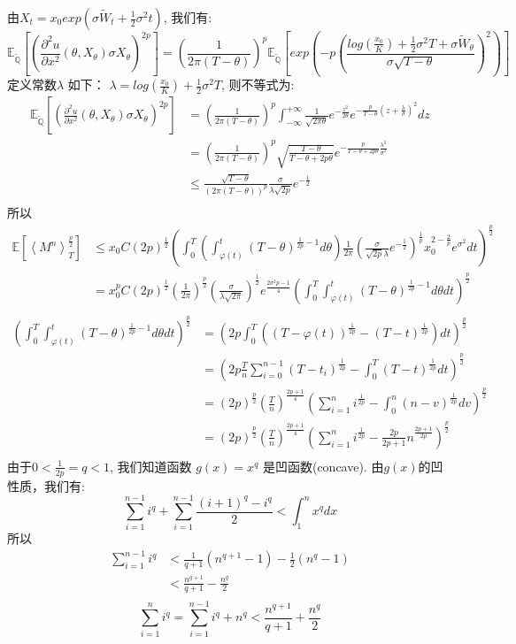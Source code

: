 由$X_t=x_0exp(\sigma \widetilde{W}_t+\frac{1}{2}\sigma^2t)$, 我们有:
\[
\mathbb{E}_{\widetilde{\mathbb{Q}}}[ (\frac{\partial^2 u}{\partial x^2}(\theta, X_\theta)\sigma X_\theta)^{2p}]
=(\frac{1}{2\pi(T-\theta)})^p\mathbb{E}_{\widetilde{\mathbb{Q}}}[exp(-p(\frac{log(\frac{x_0}{K})+\frac{1}{2}\sigma^2T+\sigma\widetilde{W}_{\theta}}{\sigma\sqrt{T-\theta}})^2)]
\]
定义常数$\lambda$ 如下： $\lambda=log(\frac{x_0}{K})+\frac{1}{2}\sigma^2T$, 则不等式为:
\[
\begin{split}
\mathbb{E}_{\widetilde{\mathbb{Q}}}[ (\frac{\partial^2 u}{\partial x^2}(\theta, X_\theta)\sigma X_\theta)^{2p}]
&=(\frac{1}{2\pi(T-\theta)})^p\int^{+\infty}_{-\infty}\frac{1}{\sqrt{2\pi\theta}}e^{-\frac{z^2}{2\theta}}e^{-\frac{p}{T-\theta}(z+\frac{\lambda}{\sigma})^2}dz\\
&=(\frac{1}{2\pi(T-\theta)})^p\sqrt{\frac{T-\theta}{T-\theta+2p\theta}}e^{-\frac{p}{T-\theta+2p\theta}\frac{\lambda^2}{\sigma^2}}\\
&\leq \frac{\sqrt{T-\theta}}{(2\pi(T-\theta))^p}\frac{\sigma}{\lambda\sqrt{2p}}e^{-\frac{1}{2}}\\
\end{split}
\]
所以 
\[
\begin{split}
\mathbb{E}[\left \langle M^n \right \rangle_T^{\frac{p}{2}}]&\leq
 x_0C(2p)^{\frac{1}{2}}(\int_0^T(\int_{\varphi(t)}^t (T-\theta)^{\frac{1}{2p}-1} d\theta)\frac{1}{2\pi}(\frac{\sigma}{\sqrt{2p}\lambda}e^{-\frac{1}{2}})^{\frac{1}{p}}x_0^{2-\frac{2}{p}}e^{\sigma^2}dt)^{\frac{p}{2}}\\
 &=x_0^pC(2p)^{\frac{1}{2}}(\frac{1}{2\pi})^{\frac{p}{2}}(\frac{\sigma}{\lambda\sqrt{2\pi}})^{\frac{1}{2}}e^{\frac{2\sigma^2p-1}{4}}
 (\int_0^T\int_{\varphi(t)}^t (T-\theta)^{\frac{1}{2p}-1} d\theta dt)^{\frac{p}{2}}\\
 \end{split}
 \]
 \[
 \begin{split}
 (\int_0^T\int_{\varphi(t)}^t (T-\theta)^{\frac{1}{2p}-1} d\theta dt)^{\frac{p}{2}}
 &=(2p\int_0^T((T-\varphi(t))^{\frac{1}{2p}}-(T-t)^{\frac{1}{2p}}) dt)^{\frac{p}{2}}\\
 &=(2p\frac{T}{n}\sum_{i=0}^{n-1}(T-t_i)^{\frac{1}{2p}}-\int_0^T(T-t)^{\frac{1}{2p}} dt)^{\frac{p}{2}}\\
 &=(2p)^{\frac{p}{2}}(\frac{T}{n})^{\frac{2p+1}{4}}(\sum_{i=1}^{n}i^{\frac{1}{2p}}-\int_0^n(n-v)^{\frac{1}{2p}} dv)^{\frac{p}{2}}\\
 &=(2p)^{\frac{p}{2}}(\frac{T}{n})^{\frac{2p+1}{4}}(\sum_{i=1}^{n}i^{\frac{1}{2p}}-\frac{2p}{2p+1}n^{\frac{2p+1}{2p}})^{\frac{p}{2}}\\
 \end{split}
 \]
 由于$0<\frac{1}{2p}=q<1$, 我们知道函数 $g(x)=x^q$ 是凹函数(concave). 由$g(x)$的凹性质，我们有:
 \[
 \sum_{i=1}^{n-1}i^q+\sum_{i=1}^{n-1}\frac{(i+1)^q-i^q}{2}<\int_1^{n}x^qdx
 \]
 所以
 \[
 \begin{split}
 \sum_{i=1}^{n-1}i^q
 &<\frac{1}{q+1}(n^{q+1}-1)-\frac{1}{2}(n^q-1)\\
 &<\frac{n^{q+1}}{q+1}-\frac{n^q}{2}\\
 \end{split}
 \]
 \[
 \sum_{i=1}^{n}i^q=\sum_{i=1}^{n-1}i^q+n^q<\frac{n^{q+1}}{q+1}+\frac{n^q}{2}
 \]

